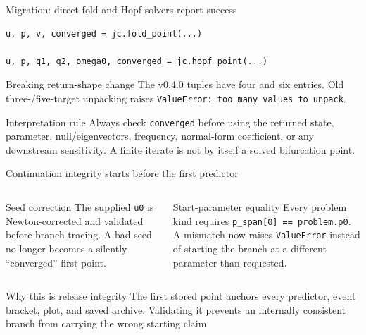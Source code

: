\begin{frame}[fragile]{Migration: direct fold and Hopf solvers report success}
\small
\begin{lstlisting}
u, p, v, converged = jc.fold_point(...)

u, p, q1, q2, omega0, converged = jc.hopf_point(...)
\end{lstlisting}
\begin{alertblock}{Breaking return-shape change}
The v0.4.0 tuples have four and six entries. Old three-/five-target unpacking
raises \texttt{ValueError: too many values to unpack}.
\end{alertblock}
\begin{block}{Interpretation rule}
Always check \texttt{converged} before using the returned state, parameter,
null/eigenvectors, frequency, normal-form coefficient, or any downstream
sensitivity. A finite iterate is not by itself a solved bifurcation point.
\end{block}
\end{frame}

\begin{frame}{Continuation integrity starts before the first predictor}
\small
\begin{columns}[T,onlytextwidth]
\begin{block}{Seed correction}
The supplied \texttt{u0} is Newton-corrected and validated before branch
tracing. A bad seed no longer becomes a silently ``converged'' first point.
\end{block}
\begin{block}{Start-parameter equality}
Every problem kind requires
\texttt{p\_span[0] == problem.p0}. A mismatch now raises \texttt{ValueError}
instead of starting the branch at a different parameter than requested.
\end{block}
\end{columns}
\vfill
\begin{alertblock}{Why this is release integrity}
The first stored point anchors every predictor, event bracket, plot, and saved
archive. Validating it prevents an internally consistent branch from carrying
the wrong starting claim.
\end{alertblock}
\end{frame}

